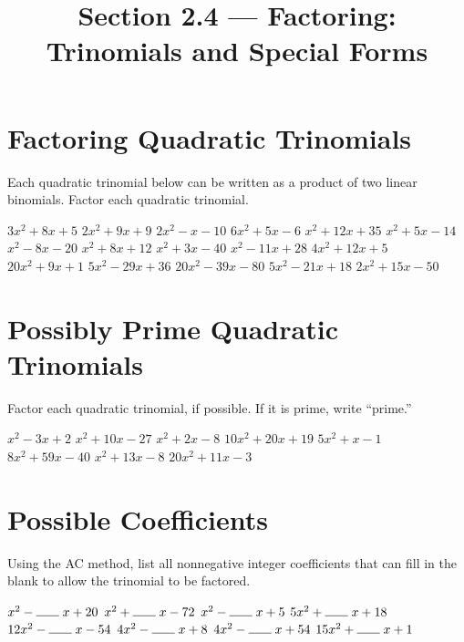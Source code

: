

\title{Section 2.4 --- Factoring: Trinomials and Special Forms}


\maketitle
\section*{Factoring Quadratic Trinomials}
Each quadratic trinomial below can be written as a product of two linear binomials.  Factor each quadratic trinomial.
\begin{smenum}
\mitemxxxx
{$3x^2+8x+5$}
{$2x^2+9x+9$}
{$2x^2-x-10$}
{$6x^2+5x-6$}
\mitemxxxx
{$x^2+12x+35$}
{$x^2+5x-14$}
{$x^2-8x-20$}
{$x^2+8x+12$}
\mitemxxxx
{$x^2+3x-40$}
{$x^2-11x+28$}
{$4x^2+12x+5$}
{$20x^2+9x+1$}
\mitemxxxx
{$5x^2-29x+36$}
{$20x^2-39x-80$}
{$5x^2-21x+18$}
{$2x^2+15x-50$}
\end{smenum}

\section*{Possibly Prime Quadratic Trinomials}
Factor each quadratic trinomial, if possible.  If it is prime, write ``prime.''
\begin{smenum}
\mitemxxxx
{$x^2-3x+2$}
{$x^2+10x-27$}
{$x^2+2x-8$}
{$10x^2+20x+19$}
\mitemxxxx
{$5x^2+x-1$}
{$8x^2+59x-40$}
{$x^2+13x-8$}
{$20x^2+11x-3$}
\end{smenum}

\section*{Possible Coefficients}
Using the AC method, list all nonnegative integer coefficients that can fill in the blank to allow the trinomial to be factored.
\begin{smenum}
\mitemxxxx
{$x^2-\MakeBlank[.25in]\;x+20$}
{$x^2+\MakeBlank[.25in]\;x-72$}
{$x^2-\MakeBlank[.25in]\;x+5$}
{$5x^2+\MakeBlank[.25in]\;x+18$}
\mitemxxxx
{$12x^2-\MakeBlank[.25in]\;x-54$}
{$4x^2-\MakeBlank[.25in]\;x+8$}
{$4x^2-\MakeBlank[.25in]\;x+54$}
{$15x^2+\MakeBlank[.25in]\;x+1$}
\end{smenum}

